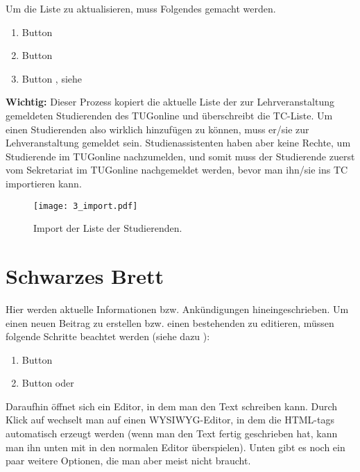 Um die Liste zu aktualisieren, muss Folgendes gemacht werden.
\begin{enumerate}
\item Button 
\item Button 
\item Button , siehe 
\end{enumerate}

{\bf Wichtig:} Dieser Prozess kopiert die aktuelle Liste der zur
Lehrveranstaltung gemeldeten Studierenden des TUGonline und überschreibt die
TC-Liste. Um einen Studierenden also wirklich hinzufügen zu können, muss er/sie
zur Lehveranstaltung gemeldet sein. Studienassistenten haben aber keine Rechte,
um Studierende im TUGonline nachzumelden, und somit muss der Studierende zuerst
vom Sekretariat im TUGonline  nachgemeldet werden, bevor man ihn/sie ins TC
importieren kann.

\begin{figure}[htbp]
  \begin{center}
  \texttt{[image: 3\_import.pdf]}
  \caption{ Import der Liste der Studierenden.}
  \label{fig:import}
  \end{center}
\end{figure}

\section{Schwarzes Brett}

Hier werden aktuelle Informationen bzw. Ankündigungen hineingeschrieben. Um
einen neuen Beitrag zu erstellen bzw. einen bestehenden zu editieren, müssen
folgende Schritte beachtet werden (siehe dazu ):
\begin{enumerate}
\item Button 
\item Button  oder 
\end{enumerate}

Daraufhin öffnet sich ein Editor, in dem man den Text schreiben kann. Durch
Klick auf  wechselt man auf einen WYSIWYG\footnotemark[1]
-Editor, in dem die HTML-tags automatisch erzeugt werden (wenn man den Text
fertig geschrieben hat, kann man ihn unten mit  in den
normalen Editor überspielen). Unten gibt es noch ein paar weitere Optionen,
die man aber meist nicht braucht.


